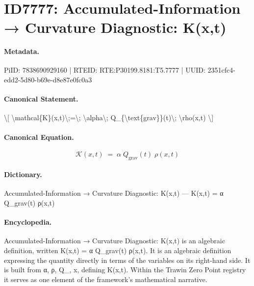 \section*{ID7777: Accumulated-Information → Curvature Diagnostic: K(x,t)}
\paragraph{Metadata.}
PiID: 7838690929160 | RTEID: RTE:P30199.8181:T5.7777 | UUID: 2351cfc4-edd2-5d80-b69e-d8e87e0fc0a3

\paragraph{Canonical Statement.}
\textbackslash{}[ \textbackslash{}mathcal\{K\}(x,t)\textbackslash{};=\textbackslash{}; \textbackslash{}alpha\textbackslash{}; Q\_\{\textbackslash{}text\{grav\}\}(t)\textbackslash{}; \textbackslash{}rho(x,t) \textbackslash{}]

\paragraph{Canonical Equation.}
\[
\mathcal{K}(x,t)\;=\; \alpha\; Q_{\text{grav}}(t)\; \rho(x,t)
\]

\paragraph{Dictionary.}
Accumulated-Information → Curvature Diagnostic: K(x,t) — K(x,t) = α Q\_grav(t) ρ(x,t)

\paragraph{Encyclopedia.}
Accumulated-Information → Curvature Diagnostic: K(x,t) is an algebraic definition, written K(x,t) = α Q\_grav(t) ρ(x,t). It is an algebraic definition expressing the quantity directly in terms of the variables on its right-hand side. It is built from α, ρ, Q\_, x, defining K(x,t). Within the Trawin Zero Point registry it serves as one element of the framework's mathematical narrative.
